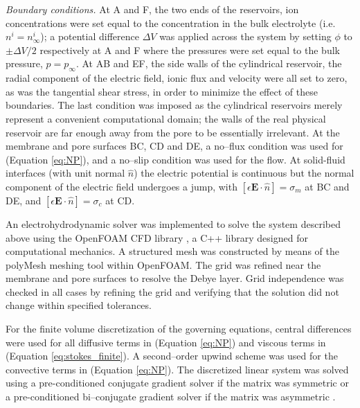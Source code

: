 {\it Boundary conditions.} At A and F, the two ends of the reservoirs, ion concentrations were set equal to the concentration in the bulk electrolyte (i.e. $n^i = n^{i}_{\infty}$); a potential difference $\Delta V$ was applied across the system by setting $\phi$ to $\pm \Delta V/2$ respectively at A and F where the pressures were set equal to the bulk pressure, $p = p_\infty$. At AB and EF, the side walls of the cylindrical reservoir, the radial component of the electric field, ionic flux and velocity were all set to zero, as was the tangential shear stress, in order to minimize the effect of these boundaries.
The last condition was imposed as the cylindrical reservoirs merely represent a convenient 
computational domain; the walls of the real physical reservoir are far enough away from the pore to be essentially irrelevant.
At the membrane and pore surfaces BC, CD and DE, a no--flux condition was used for (Equation \ref{eq:NP}), and a no--slip condition was used for the flow. At solid-fluid interfaces (with unit normal $\hat{n}$)
the electric potential is continuous but the normal component of the electric field undergoes a jump, with
$[ \epsilon \mathbf{E}\cdot \hat{n} ] = \sigma_m$ at BC and DE, 
and $[ \epsilon \mathbf{E}\cdot \hat{n} ] = \sigma_c$ at CD.

An electrohydrodynamic solver was implemented to solve the system described above using the OpenFOAM CFD library \cite{OPENFOAM}, a C++ library designed for computational mechanics. A structured mesh was constructed by means of the polyMesh
meshing tool within OpenFOAM. The grid was refined near the membrane and pore surfaces to resolve the Debye layer. Grid independence was checked in all cases by refining the grid and verifying that the 
solution did not change within specified tolerances.

For the finite volume discretization of the governing equations, central differences were used for all diffusive terms in (Equation \ref{eq:NP}) and viscous terms in (Equation \ref{eq:stokes_finite}). A second--order upwind scheme was used for the convective terms in (Equation \ref{eq:NP}). The discretized linear system was solved using a pre-conditioned conjugate gradient solver if the matrix was symmetric or a pre-conditioned bi--conjugate gradient solver if the matrix was 
asymmetric \cite{ferziger&peric}. 

